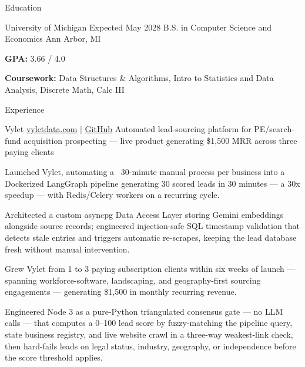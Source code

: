 \documentclass[
	11pt
]{../../../template}
\begin{document}
	\begin{rSection}{E}{ducation}
		\begin{rSectionEntry}
			{University of Michigan}
			{Expected May 2028}
			{B.S. in Computer Science and Economics}
			{}
			{Ann Arbor, MI}

			\item \textbf{GPA:} 3.66 / 4.0
			\item \textbf{Coursework:} Data Structures \& Algorithms, Intro to Statistics and Data Analysis, Discrete Math, Calc III
		\end{rSectionEntry}
	\end{rSection}

	\begin{rSection}{E}{xperience}
		\begin{rSectionEntry}
			{Vylet}
			{\href{https://vyletdata.com}{vyletdata.com} $\vert$ \href{https://github.com/Verdent06/Lead-Gen-Agentic-Pipeline}{GitHub}}
			{Automated lead-sourcing platform for PE/search-fund acquisition prospecting --- live product generating \$1,500 MRR across three paying clients}
			{}
			{}

			\item Launched Vylet, automating a ~30-minute manual process per business into a Dockerized LangGraph pipeline generating 30 scored leads in 30 minutes --- a 30x speedup --- with Redis/Celery workers on a recurring cycle.
			\item Architected a custom asyncpg Data Access Layer storing Gemini embeddings alongside source records; engineered injection-safe SQL timestamp validation that detects stale entries and triggers automatic re-scrapes, keeping the lead database fresh without manual intervention.
			\item Grew Vylet from 1 to 3 paying subscription clients within six weeks of launch --- spanning workforce-software, landscaping, and geography-first sourcing engagements --- generating \$1,500 in monthly recurring revenue.
			\item Engineered Node 3 as a pure-Python triangulated consensus gate --- no LLM calls --- that computes a 0--100 lead score by fuzzy-matching the pipeline query, state business registry, and live website crawl in a three-way weakest-link check, then hard-fails leads on legal status, industry, geography, or independence before the score threshold applies.
		\end{rSectionEntry}


\end{rSection}
\end{document}
